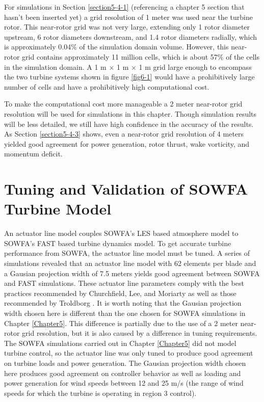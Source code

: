 For simulations in Section \ref{section5-4-1} (referencing a chapter 5 section that hasn't been inserted yet) a grid resolution of 1 meter was used near the turbine rotor. This near-rotor grid was not very large, extending only 1 rotor diameter upstream, 6 rotor diameters downstream, and 1.4 rotor diameters radially, which is approximately 0.04\% of the simulation domain volume. However, this near-rotor grid contains approximately 11 million cells, which is about 57\% of the cells in the simulation domain. A 1 m $\times$ 1 m $\times$ 1 m grid large enough to encompass the two turbine systems shown in figure \ref{fig6-1} would have a prohibitively large number of cells and have a prohibitively high computational cost. 

To make the computational cost more manageable a 2 meter near-rotor grid resolution will be used for simulations in this chapter. Though simulation results will be less detailed, we still have high confidence in the accuracy of the results. As Section \ref{section5-4-3} shows, even a near-rotor grid resolution of 4 meters yielded good agreement for power generation, rotor thrust, wake vorticity, and momentum deficit.  


\section{Tuning and Validation of SOWFA Turbine Model} \label{section6-4}

An actuator line model couples SOWFA's LES based atmosphere model to SOWFA's FAST based turbine dynamics model. To get accurate turbine performance from SOWFA, the actuator line model must be tuned. A series of simulations revealed that an actuator line model with 62 elements per blade and a Gausian projection width of 7.5 meters yields good agreement between SOWFA and FAST simulations. These actuator line parameters comply with the best practices recommended by Churchfield, Lee, and Moriarty \cite{churchfield2012} as well as those recommended by Troldborg \cite{troldborg2009}. It is worth noting that the Gausian projection width chosen here is different than the one chosen for SOWFA simulations in Chapter \ref{Chapter5}. This difference is partially due to the use of a 2 meter near-rotor grid resolution, but it is also caused by a difference in tuning requirements. The SOWFA simulations carried out in Chapter \ref{Chapter5} did not model turbine control, so the actuator line was only tuned to produce good agreement on turbine loads and power generation. The Gausian projection width chosen here produces good agreement on controller behavior as well as loading and power generation for wind speeds between 12 and 25 m/s (the range of wind speeds for which the turbine is operating in region 3 control).

